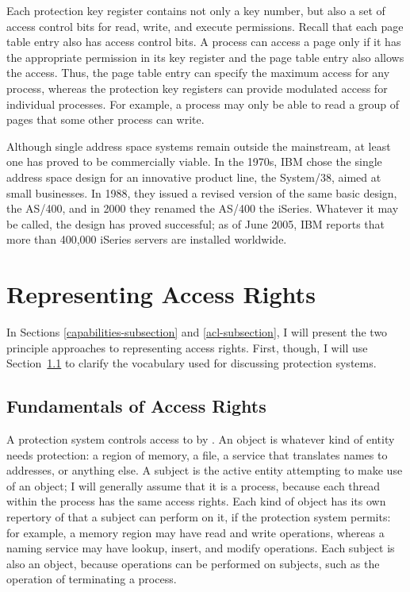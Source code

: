 Each protection key register contains not only a key number, but also
a set of access control bits for read, write, and execute permissions.  Recall
that each page table entry also has access control bits.  A process
can access a page only if it has the appropriate permission in its key
register and the page table entry also allows the access.  Thus, the
page table entry can specify the maximum access for any process,
whereas the protection key registers can provide modulated access for
individual processes.  For example, a process may only be able to read
a group of pages that some other process can write.

Although single address space systems remain outside the mainstream,
at least one has proved to be commercially viable.  In the 1970s, IBM
chose the single address space design for an innovative product line, the System/38,
aimed at small businesses.  In 1988,
they issued a revised version of the same basic design, the
AS/400, and in 2000 they renamed the AS/400 the
iSeries.  Whatever it may be called, the design has
proved successful; as of June 2005, IBM reports that more than 
400,000 iSeries servers are installed worldwide.

\section{Representing Access Rights}\label{access-rights-section}

In Sections \ref{capabilities-subsection} and \ref{acl-subsection}, I will present the two principle
approaches to representing access rights.  First, though, I will
use Section~\ref{access-fundamentals-subsections} to clarify the vocabulary used for discussing
protection systems.

\subsection{Fundamentals of Access Rights}\label{access-fundamentals-subsections}

A protection system controls access to  by
.  An object is whatever kind of entity needs
protection: a region of memory, a file, a service that translates
names to addresses, or anything else.  
A subject is the active entity
attempting to make use of an object; I will generally assume that it is
a process, because each thread within the process has the same access
rights.
Each kind of object has its own
repertory of  that a subject can perform on it, if
the protection system permits: for example, a memory region may have
read and write operations, whereas a naming service may have lookup,
insert, and modify operations.  Each subject is also an object,
because operations can be performed on subjects, such as the operation
of terminating a process.

